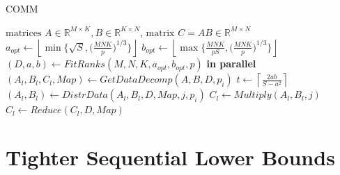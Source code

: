 \documentclass[sigplan,review,anonymous]{acmart}\settopmatter{printfolios=true,printccs=false,printacmref=false}
\begin{document}
\begin{algorithm}
	\small
\caption{COMM} \label{alg:comm}
\begin{algorithmic}[1]
\Require $\text{matrices } A \in \mathbb{R}^{M \times K}, B \in 
\mathbb{R}^{K \times N}$,
\Ensure $\text{matrix } C = AB \in \mathbb{R}^{M \times N}$
\State $a_{opt} \gets \left \lfloor \min\Big\{\sqrt{S}, 
\Big(\frac{MNK}{p}\Big)^{1/3} \Big\} \right \rfloor$ 
\label{alg:line:aopt}
\State $b_{opt} \gets \left \lfloor \max\Big\{\frac{MNK}{pS}, 
\Big(\frac{MNK}{p}\Big)^{1/3} \Big\} \right \rfloor$ 
\label{alg:line:bopt}
\State $(D, a, b) \gets FitRanks(M,N,K,a_{opt},b_{opt},p)$ 
\label{alg:line:fitranks}
 \textbf{in parallel}
\label{alg:line:outerloopStart}
%
\State $(A_l, B_l, C_l,Map) \gets GetDataDecomp(A,B, D, p_i)$ 
\label{alg:line:datadecomp}
\State $t \gets \left \lceil{\frac{2ab}{S - a^2}}\right \rceil$ 
\label{alg:line:steps}
\label{alg:line:innerloopStart}
\State $(A_l, B_l) \gets DistrData(A_l,B_l,D, Map, j, p_i)$ 
\label{alg:line:distrData}
\State $C_l \gets Multiply(A_l, B_l,j)$ 
\label{alg:line:compute}
\EndFor
\label{alg:line:innerLoopEnd}
\State $C_l \gets Reduce(C_l,D,  Map)$ 
\label{alg:line:reduce}
\EndFor
\label{alg:line:outerLoopEnd}
\end{algorithmic}
\end{algorithm}


\section{Tighter Sequential Lower Bounds}
\label{sec:background}
\end{document}

